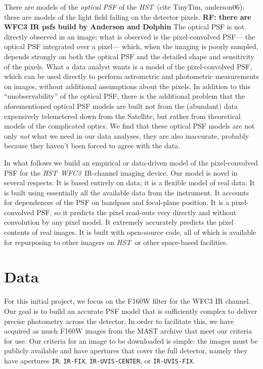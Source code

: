 \documentclass[12pt,letterpaper,preprint]{aastex}
\newcommand{\instrument}[1]{\textsl{#1}}
\newcommand{\rf}[1]{\textbf{RF: #1}}
\newcommand{\HST}{\instrument{HST}}
\newcommand{\WFC}{\instrument{WFC3}}
\begin{document}
There are models of the \emph{optical PSF} of the \HST\ (cite TinyTim, anderson06);
  these are models of the light field falling on the detector pixels. \rf{there are WFC3 IR psfs build by Anderson and Dolphin}
The optical PSF is not directly observed in an image;
  what is observed is the pixel-convolved PSF---%
  the optical PSF integrated over a pixel---%
  which, when the imaging is poorly sampled,
  depends strongly on both the optical PSF
  and the detailed shape and sensitivity of the pixels.
What a data analyst wants is a model of the pixel-convolved PSF,
  which can be used directly to perform astrometric and photometric measurements on images,
  without additional assumptions about the pixels.
In addition to this ``unobservability'' of the optical PSF,
  there is the additional problem that the aforementioned optical PSF models
  are built not from the (abundant) data expensively telemetered down from the Satellite,
  but rather from theoretical models of the complicated optics.
We find that these optical PSF models are not only \emph{not} what we need in our data analyses,
  they are also inaccurate, probably because they haven't been forced to agree with the data.

In what follows we build an empirical or data-driven model
  of the pixel-convolved PSF for the \HST\ \WFC\ IR-channel imaging device.
Our model is novel in several respects:
It is based entirely on data;
  it is a flexible model of real data.
It is built using essentially all the available data from the instrument.
It accounts for dependences of the PSF on bandpass and focal-plane position.
It is a pixel-convolved PSF,
  so it predicts the pixel read-outs very directly and without convolution by any pixel model.
It extremely accurately predicts the pixel contents of real images.
It is built with open-source code,
  all of which is available for repurposing to other imagers on \HST\ or other space-based facilities.

\section{Data}

For this initial project, we focus on the F160W filter for the WFC3 IR channel.  Our goal is to build 
an accurate PSF model that is sufficiently complex to deliver precise photometry across the 
detector.  In order to facilitate this, we have acquired as much F160W images from the MAST 
archive that meet our criteria for use.  Our criteria for an image to be downloaded is simple: the 
images must be publicly available and have apertures that cover the full detector, namely they 
have apertures \texttt{IR}, \texttt{IR-FIX}, \texttt{IR-UVIS-CENTER}, or \texttt{IR-UVIS-FIX}.
\end{document}
